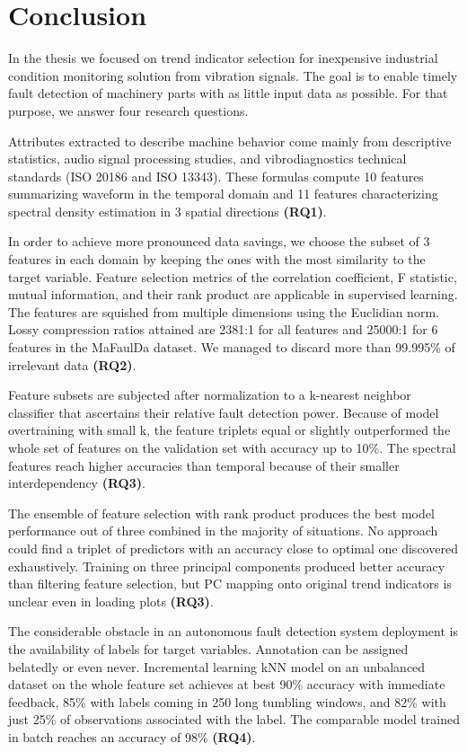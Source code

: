 \chapter{Conclusion} \label{section:conclusion}  
In the thesis we focused on trend indicator selection for inexpensive industrial condition monitoring solution from vibration signals. The goal is to enable timely fault detection of machinery parts with as little input data as possible. For that purpose, we answer four research questions.

Attributes extracted to describe machine behavior come mainly from descriptive statistics, audio signal processing studies, and vibrodiagnostics technical standards (ISO 20186 and ISO 13343). These formulas compute 10 features summarizing waveform in the temporal domain and 11 features characterizing spectral density estimation in 3 spatial directions \textbf{(RQ1)}.

In order to achieve more pronounced data savings, we choose the subset of 3 features in each domain by keeping the ones with the most similarity to the target variable. Feature selection metrics of the correlation coefficient, F statistic, mutual information, and their rank product are applicable in supervised learning. The features are squished from multiple dimensions using the Euclidian norm. Lossy compression ratios attained are 2381:1 for all features and 25000:1 for 6 features in the MaFaulDa dataset. We managed to discard more than 99.995\% of irrelevant data \textbf{(RQ2)}.

Feature subsets are subjected after normalization to a k-nearest neighbor classifier that ascertains their relative fault detection power. Because of model overtraining with small k, the feature triplets equal or slightly outperformed the whole set of features on the validation set with accuracy up to 10\%. The spectral features reach higher accuracies than temporal because of their smaller interdependency \textbf{(RQ3)}. 

The ensemble of feature selection with rank product produces the best model performance out of three combined in the majority of situations. No approach could find a triplet of predictors with an accuracy close to optimal one discovered exhaustively. Training on three principal components produced better accuracy than filtering feature selection, but PC mapping onto original trend indicators is unclear even in loading plots \textbf{(RQ3)}.

The considerable obstacle in an autonomous fault detection system deployment is the availability of labels for target variables. Annotation can be assigned belatedly or even never. Incremental learning kNN model on an unbalanced dataset on the whole feature set achieves at best 90\% accuracy with immediate feedback, 85\% with labels coming in 250 long tumbling windows, and 82\% with just 25\% of observations associated with the label. The comparable model trained in batch reaches an accuracy of 98\% \textbf{(RQ4)}.

